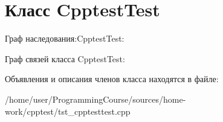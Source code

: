 \hypertarget{classCpptestTest}{\section{Класс Cpptest\+Test}
\label{classCpptestTest}
}


Граф наследования\+:Cpptest\+Test\+:


Граф связей класса Cpptest\+Test\+:


Объявления и описания членов класса находятся в файле\+:\begin{DoxyCompactItemize}
\item 
/home/user/\+Programming\+Course/sources/home-\/work/cpptest/tst\+\_\+cpptesttest.\+cpp\end{DoxyCompactItemize}
